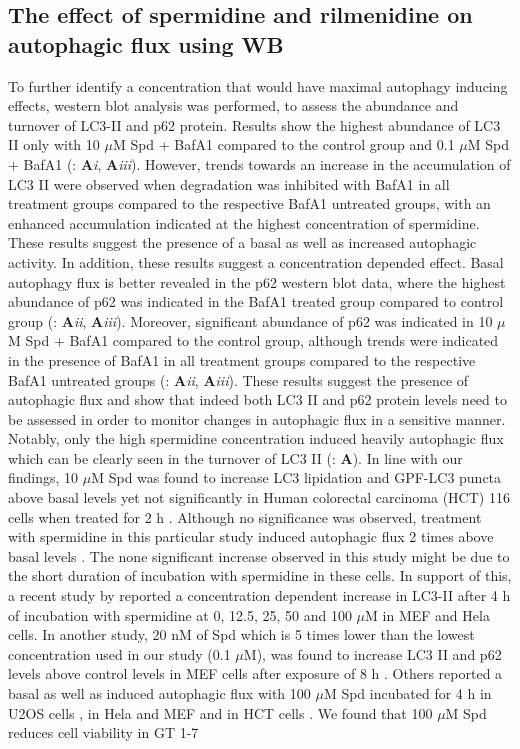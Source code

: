 {\subsection{The effect of spermidine and rilmenidine on autophagic flux using WB}

To further identify a concentration that would have maximal autophagy inducing effects, western blot analysis was performed, to assess the abundance and turnover of LC3-II and p62 protein. Results show the highest abundance of LC3 II only with 10 $\mu$M Spd + BafA1 compared to the control group and 0.1 $\mu$M Spd + BafA1 (: \textbf{A}\textit{i}, \textbf{A}\textit{iii}). However, trends towards an increase in the accumulation of LC3 II were observed when degradation was inhibited with BafA1 in all treatment groups compared to the respective BafA1 untreated groups, with an enhanced accumulation indicated at the highest concentration of spermidine. These results suggest the presence of a basal as well as increased autophagic activity. In addition, these results suggest a concentration depended effect. Basal autophagy flux is better revealed in the p62 western blot data, where the highest abundance of p62 was indicated in the BafA1 treated group compared to control group (: \textbf{A}\textit{ii}, \textbf{A}\textit{iii}). Moreover, significant abundance of p62 was indicated in 10 $\mu$M Spd + BafA1 compared to the control group, although trends were indicated in the presence of BafA1 in all treatment groups compared to the respective BafA1 untreated groups (: \textbf{A}\textit{ii}, \textbf{A}\textit{iii}). These results suggest the presence of autophagic flux and show that indeed both LC3 II and p62 protein levels need to be assessed in order to monitor changes in autophagic flux in a sensitive manner. Notably, only the high spermidine concentration induced heavily autophagic flux which can be clearly seen in the turnover of LC3 II (: \textbf{A}). In line with our findings, 10 $\mu$M Spd was found to increase LC3 lipidation and GPF-LC3 puncta above  basal levels yet not significantly in Human colorectal carcinoma (HCT) 116 cells when treated for 2 h \citep{Morselli2011}. Although no significance was observed, treatment with spermidine in this particular study induced autophagic flux 2 times above basal levels \citep{Morselli2011}. The none significant increase observed in this study might be due to the short duration of incubation with spermidine in these cells. In support of this, a recent study by \citet{Yue2017} reported a concentration dependent increase in LC3-II after 4 h of incubation with spermidine at  0, 12.5, 25, 50 and 100 $\mu$M in MEF and Hela cells.  In another study, 20 nM of Spd which is 5 times lower than the lowest concentration used in our study (0.1 $\mu$M), was found to increase LC3 II and p62 levels above control levels in MEF cells after exposure of 8 h \citep{DuToit2018a}. Others reported a basal as well as induced autophagic flux with 100 $\mu$M Spd incubated for 4 h in U2OS cells  \citep{Pietrocola2015}, in Hela and MEF \citep{Yue2017} and in HCT cells \citep{Morselli2011}. We found that 100 $\mu$M Spd reduces cell viability in GT 1-7 }
